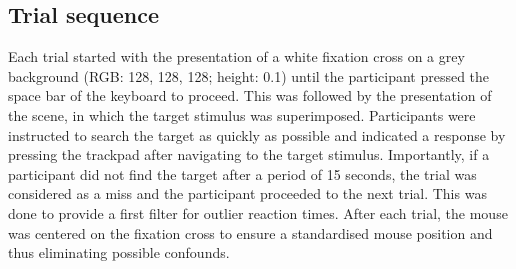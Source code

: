 \documentclass[
  man,floatsintext]{apa7}
\begin{document}
\hypertarget{trial-sequence}{%
\subsection{Trial sequence}\label{trial-sequence}}

Each trial started with the presentation of a white fixation cross on a grey background (RGB: 128, 128, 128; height: 0.1) until the participant pressed the space bar of the keyboard to proceed. This was followed by the presentation of the scene, in which the target stimulus was superimposed. Participants were instructed to search the target as quickly as possible and indicated a response by pressing the trackpad after navigating to the target stimulus. Importantly, if a participant did not find the target after a period of 15 seconds, the trial was considered as a miss and the participant proceeded to the next trial. This was done to provide a first filter for outlier reaction times. After each trial, the mouse was centered on the fixation cross to ensure a standardised mouse position and thus eliminating possible confounds.
\end{document}
